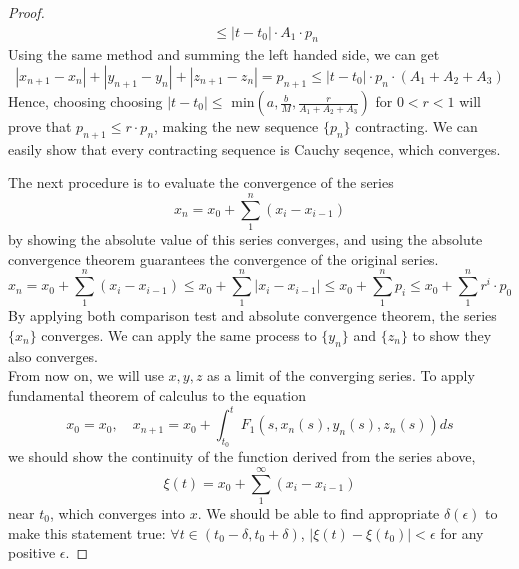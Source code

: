\documentclass[a4paper,10pt]{article}
\begin{document}
\begin{proof}
\begin{align*}
            &\leq |t - t_0| \cdot A_1 \cdot p_{n}
        \end{align*}
        Using the same method and summing the left handed side, we can get
        \begin{displaymath}
            |x_{n+1} - x_n| + |y_{n+1} -y_n| + |z_{n+1} - z_n| = p_{n+1} \leq |t- t_0| \cdot p_n \cdot (A_1 + A_2 + A_3)
        \end{displaymath}
        Hence, choosing choosing $|t - t_0| \leq$ min$(a, \frac{b}{M}, \frac{r}{A_1 + A_2 + A_3})$ for $0 < r < 1$ will prove that $p_{n+1} \leq r \cdot p_n$, making the new sequence $\{ p_n \}$ contracting. We can easily show that every contracting sequence is Cauchy seqence, which converges. 
        
        The next procedure is to evaluate the convergence of the series
        \begin{displaymath}
            x_n = x_0 + \sum_{1}^{n} (x_i - x_{i-1})
        \end{displaymath}
        by showing the absolute value of this series converges, and using the absolute convergence theorem guarantees the convergence of the original series.
        \begin{displaymath}
            x_n = x_0 + \sum_{1}^{n} (x_i - x_{i-1}) \leq x_0 + \sum_{1}^{n} |x_i - x_{i-1}| \leq x_0 + \sum_{1}^{n} p_i \leq x_0 + \sum_{1}^{n} r^i \cdot p_0
        \end{displaymath}
        By applying both comparison test and absolute convergence theorem, the series $\{ x_n \}$ converges. We can apply the same process to $\{ y_n \}$ and $\{ z_n \}$ to show they also converges.\\ \newline
        From now on, we will use $x, y, z$ as a limit of the converging series.
        To apply fundamental theorem of calculus to the equation
        \begin{displaymath}
            x_0 = x_0, \quad x_{n+1} = x_0 + \int_{t_0}^{t} F_1(s, x_n(s), y_n(s), z_n(s)) ds
        \end{displaymath}
        we should show the continuity of the function derived from the series above,
        \begin{displaymath}
            \xi(t) = x_0 + \sum_{1}^{\infty} (x_i - x_{i-1})
        \end{displaymath}
        near $t_0$, which converges into $x$.
        We should be able to find appropriate $\delta(\epsilon)$ to make this statement true: $\forall t \in (t_0 - \delta, t_0 + \delta)$, $|\xi(t) - \xi(t_0)| < \epsilon$ for any positive $\epsilon$. 

\end{proof}
\end{document}
